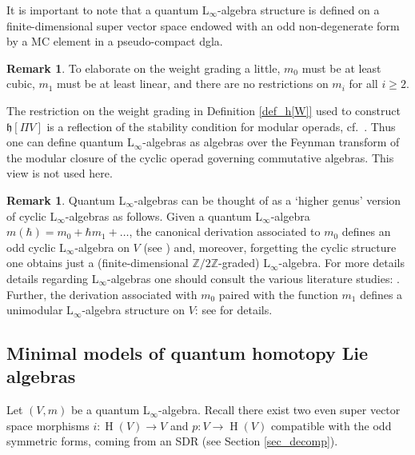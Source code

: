 \documentclass[]{amsart}
\theoremstyle{definition}
\newtheorem{remark}[theorem]{Remark}
\newcommand{\Linf}{L$_\infty$}
\newcommand{\homology}{\operatorname{H}}
\begin{document}
It is important to note that a quantum \Linf-algebra structure is defined on a finite-dimensional super vector space endowed with an odd non-degenerate form by a MC element in a pseudo-compact dgla.

\begin{remark}
To elaborate on the weight grading a little, $m_0$ must be at least cubic, $m_1$ must be at least linear, and there are no restrictions on $m_i$ for all $i\geq 2$.

The restriction on the weight grading in Definition \ref{def_h[W]} used to construct $\mathfrak{h}[\Pi V]$ is a reflection of the stability condition for modular operads, cf.~\cite{getzler_kapranov_modular_operads}. Thus one can define quantum \Linf-algebras as algebras over the Feynman transform of the modular closure of the cyclic operad governing commutative algebras. This view is not used here.
\end{remark}

\begin{remark}\label{rem_recovering_defs}
Quantum \Linf-algebras can be thought of as a `higher genus' version of cyclic \Linf-algebras as follows. Given a quantum \Linf-algebra $m(\hbar)= m_0 + \hbar m_1 + \dots$, the canonical derivation associated to $m_0$ defines an odd cyclic \Linf-algebra on $V$ (see \cite{loday}) and, moreover, forgetting the cyclic structure one obtains just a (finite-dimensional $\mathbb{Z}/2\mathbb{Z}$-graded) \Linf-algebra. For more details details regarding \Linf-algebras one should consult the various literature studies: \cite{braun_laz_unimodular,chuang_laz_feynman,hamilton_laz_noncomm_geo,lada_markl}. Further, the derivation associated with $m_0$ paired with the function $m_1$ defines a unimodular \Linf-algebra structure on $V$: see \cite{braun_laz_unimodular,granaker} for details.
\end{remark}

\subsection{Minimal models of quantum homotopy Lie algebras}
Let $(V,m)$ be a quantum \Linf-algebra. Recall there exist two even super vector space morphisms $i\colon \homology (V)\to V$ and $p\colon V\to \homology (V)$ compatible with the odd symmetric forms, coming from an SDR (see Section \ref{sec_decomp}).
\end{document}
